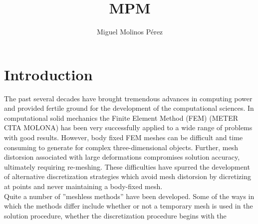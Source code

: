 \message{ !name(../mpm.tex)}\documentclass[10pt,a4paper]{article}
\author{Miguel Molinos Pérez}
\title{MPM}
\begin{document}
\section{Introduction}
\label{sec:intro}

The past several decades have brought tremendous advances in computing
power and provided fertile ground for the development of the
computational sciences. In computational solid mechanics the Finite
Element Method (FEM) (METER CITA MOLONA) has been very successfully
applied to a wide range of problems with good results. However, body
fixed FEM meshes can be difficult and time consuming to generate for
complex three-dimensional objects. Further, mesh distorsion associated
with large deformations compromises solution accuracy, ultimately
requiring re-meshing. These difficulties have spurred the development
of alternative discretization strategies which avoid mesh distorsion by
dicretizing at points and never
maintaining a body-fixed mesh.\\

Quite a number of ''meshless methods'' have been developed. Some of
the ways in which the methods differ include whether or not a
temporary mesh is used in the solution procedure, whether the
discretization procedure begins with the

\cite{Schreyer1994}



\end{document}
